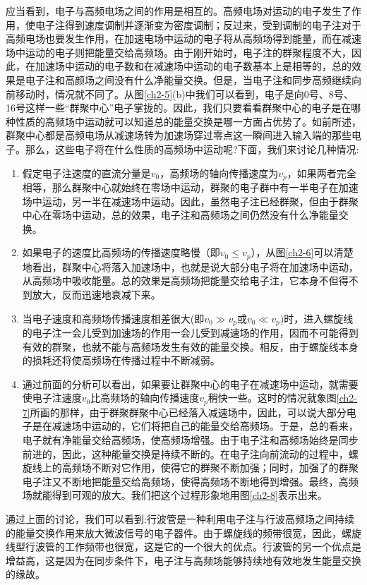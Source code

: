 应当看到，电子与高频电场之间的作用是相互的。高频电场对运动的电子发生了作用，使电子注得到速度调制并逐渐变为密度调制；反过来，受到调制的电子注对于高频电场也要发生作用，在加速电场中运动的电子将从高频场得到能量，而在减速场中运动的电子则把能量交给高频场。由于刚开始时，电子注的群聚程度不大，因此，在加速场中运动的电子数和在减速场中运动的电子数基本上是相等的，总的效果是电子注和高颜场之间没有什么净能量交换。但是，当电子注和同步高频继续向前移动时，情况就不同了。从图\ref{ch2-5}(b)中我们可以看到，电子是向0号、8号、16号这样一些“群聚中心”电子掌拢的。因此，我们只要看看群聚中心的电子是在哪种性质的高频场中运动就可以知道总的能量交换是哪一方面占优势了。如前所述，群聚中心都是高频电场从减速场转为加速场穿过零点这一瞬间进入输入端的那些电子。那么，这些电子将在什么性质的高频场中运动呢?下面，我们来讨论几种情况:
\begin{enumerate}
	\item 假定电子注速度的直流分量是$ v_0 $，高频场的轴向传播速度为$ v_p $，如果两者完全相等，那么群聚中心就始终在零场中运动，群聚的电子群中有一半电子在加速场中运动，另一半在减速场中运动。因此，虽然电子注已经群聚，但由于群聚中心在零场中运动，总的效果，电子注和高频场之间仍然没有什么净能量交换。
	\item 如果电子的速度比高频场的传播速度略慢（即$ v_0 \leq v_p $），从图\ref{ch2-6}可以清楚地看出，群聚中心将落入加速场中，也就是说大部分电子将在加速场中运动，从高频场中吸收能量。总的效果是高频场把能量交给电子注，它本身不但得不到放大，反而迅速地衰减下来。
	\item 当电子速度和高频场传播速度相差很大(即$ v_0\gg v_p $或$ v_0 \ll v_p $)时，进入螺旋线的电子注一会儿受到加速场的作用一会儿受到减速场的作用，因而不可能得到有效的群聚，也就不能与高频场发生有效的能量交换。相反，由于螺旋线本身的损耗还将使高频场在传播过程中不断减弱。
	\item 通过前面的分析可以看出，如果要让群聚中心的电子在减速场中运动，就需要使电子注速度$ v_0 $比高频场的轴向传播速度$ v_p $稍快一些。这时的情况就象图\ref{ch2-7}所画的那样，由于群聚群聚中心已经落入减速场中，因此，可以说大部分电子是在减速场中运动的，它们将把自己的能量交给高频场。于是，总的看来，电子就有净能量交给高频场，使高频场增强。由于电子注和高频场始终是同步前进的，因此，这种能量交换是持续不断的。在电子注向前流动的过程中，螺旋线上的高频场不断对它作用，使得它的群聚不断加强；同时，加强了的群聚电子注又不断地把能量交给高频场，使得高频场不断地得到增强。最终，高频场就能得到可观的放大。我们把这个过程形象地用图\ref{ch2-8}表示出来。
\end{enumerate}

通过上面的讨论，我们可以看到:行波管是一种利用电子注与行波高频场之间持续的能量交换作用来放大微波信号的电子器件。由于螺旋线的频带很宽，因此，螺旋线型行波管的工作频带也很宽，这是它的一个很大的优点。行波管的另一个优点是增益高，这是因为在同步条件下，电子注与高频场能够持续地有效地发生能量交换的缘故。

